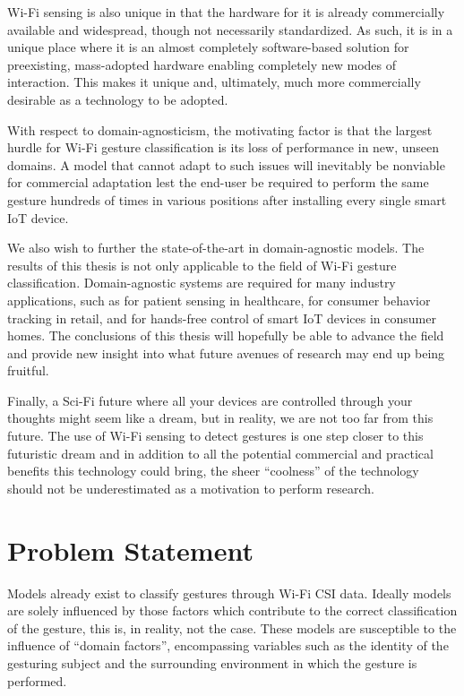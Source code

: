 Wi-Fi sensing is also unique in that the hardware for it is already commercially available and widespread, though not necessarily standardized.
As such, it is in a unique place where it is an almost completely software-based solution for preexisting, mass-adopted hardware enabling completely new modes of interaction.
This makes it unique and, ultimately, much more commercially desirable as a technology to be adopted.

With respect to domain-agnosticism, the motivating factor is that the largest hurdle for Wi-Fi gesture classification is its loss of performance in new, unseen domains.
A model that cannot adapt to such issues will inevitably be nonviable for commercial adaptation lest the end-user be required to perform the same gesture hundreds of times in various positions after installing every single smart IoT device.

We also wish to further the state-of-the-art in domain-agnostic models.
The results of this thesis is not only applicable to the field of Wi-Fi gesture classification.
Domain-agnostic systems are required for many industry applications, such as for patient sensing in healthcare, for consumer behavior tracking in retail, and for hands-free control of smart IoT devices in consumer homes.
The conclusions of this thesis will hopefully be able to advance the field and provide new insight into what future avenues of research may end up being fruitful.

Finally, a Sci-Fi future where all your devices are controlled through your thoughts might seem like a dream, but in reality, we are not too far from this future.
The use of Wi-Fi sensing to detect gestures is one step closer to this futuristic dream and in addition to all the potential commercial and practical benefits this technology could bring, the sheer ``coolness'' of the technology should not be underestimated as a motivation to perform research.

\section{Problem Statement}\label{sec:intro-problem-statement}
Models already exist to classify gestures through Wi-Fi CSI data.
Ideally models are solely influenced by those factors which contribute to the correct classification of the gesture, this is, in reality, not the case.
These models are susceptible to the influence of ``domain factors'', encompassing variables such as the identity of the gesturing subject and the surrounding environment in which the gesture is performed.

